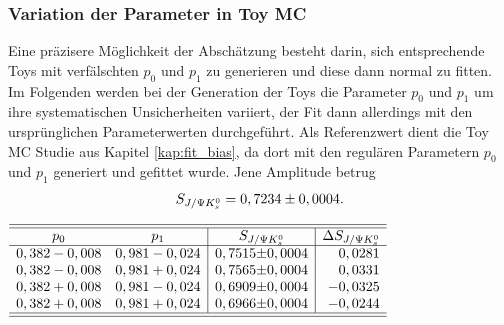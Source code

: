 \subsubsection{Variation der Parameter in Toy MC}
Eine präzisere Möglichkeit der Abschätzung besteht darin, sich entsprechende Toys mit verfälschten $p_0$ und $p_1$ zu generieren und diese dann normal zu fitten. Im Folgenden werden bei der Generation der Toys die Parameter $p_0$ und $p_1$ um ihre systematischen Unsicherheiten variiert, der Fit dann allerdings mit den ursprünglichen Parameterwerten durchgeführt. Als Referenzwert dient die Toy MC Studie aus Kapitel \ref{kap:fit_bias}, da dort mit den regulären Parametern $p_0$ und $p_1$ generiert und gefittet wurde. Jene Amplitude betrug
\begin{align}
S_{J/\Psi K_s^0} = 0,7234 \pm 0,0004.
\end{align}
\begin{table}[hptb]
\centering
\caption{Variation des Fitergebnisses für $\SJPsi$ bei Veränderung der Parameterwerte $p_0$ und $p_1$ $\pm$ ihrer systematischen Unsicherheiten bei der Generation von Toys}
\label{tab:syst_fit_calib_toys}
$\begin{array}{cc|r@{\pm}l|r}
\hline\hline
p_0  &  p_1  &  \multicolumn{2}{c|}{\SJPsi}  & \Delta\SJPsi   \\ \hline
0,382 - 0,008  &  0,981 - 0,024  &  0,7515 & 0,0004  &   0,0281 \\
0,382 - 0,008  &  0,981 + 0,024  &  0,7565 & 0,0004  &   0,0331 \\
0,382 + 0,008  &  0,981 - 0,024  &  0,6909 & 0,0004  &  -0,0325 \\
0,382 + 0,008  &  0,981 + 0,024  &  0,6966 & 0,0004  &  -0,0244 \\
\hline\hline
\end{array}$
\end{table}

